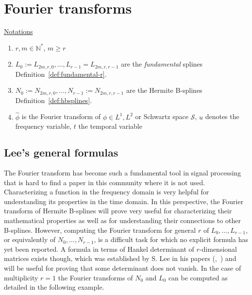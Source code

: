 \section{Fourier transforms}

\underline{Notations}
\begin{enumerate}
  \item $r, m \in \mathbb{N}^*$, $m \geq r$
  \item $L_0:=L_{2m,r,0}, \ldots, L_{r-1}=L_{2m,r,r-1}$ are the \emph{fundamental} splines 
    Definition~\ref{def:fundamental-r}.
  \item $N_0:=N_{2m,r,0}, \ldots, N_{r-1}:=N_{2m,r,r-1}$ are the Hermite B-splines Definition~\ref{def:hbsplines}.
  \item $\hat{\phi}$ is the Fourier transform of $\phi \in L^1, L^2$ or Schwartz space $\mathscr{S}$, $u$ denotes the 
    frequency variable, $t$ the temporal variable
\end{enumerate}

\subsection{Lee's general formulas}

The Fourier transform has become such a fundamental tool in signal processing that is hard to find a paper in this 
community where it is not used. Characterizing a function in the frequency domain is very helpful for understanding its 
properties in the time domain. In this perspective, the Fourier transform of Hermite B-splines will prove very useful 
for characterizing their mathematical properties as well as for understanding their connections to other B-splines.  
However, computing the Fourier transform for general $r$ of $L_0, \ldots, L_{r-1}$, or equivalently of $N_0, \ldots, 
N_{r-1}$, is a difficult task for which no explicit formula has yet been reported. A formula in terms of Hankel 
determinant of $r$-dimensional matrices exists though, which was established by S. Lee in his papers 
(\cite{Lee76a},~\cite{Lee76b}) and will be useful for proving that some determinant does not vanish. In the case of 
multiplicity $r=1$ the Fourier transforms of $N_0$ and $L_0$ can be computed as detailed in the following example. 

